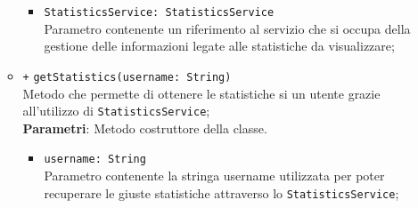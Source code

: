 \begin{itemize}
\begin{itemize}
\begin{itemize}
			\item \texttt{StatisticsService: StatisticsService} \\
			Parametro contenente un riferimento al servizio che si occupa della gestione delle informazioni legate alle statistiche da visualizzare;
		\end{itemize}
		\item \texttt{+} \texttt{getStatistics(username: String)} \\ 
		Metodo che permette di ottenere le statistiche si un utente grazie all'utilizzo di \texttt{StatisticsService}; \\
		\textbf{Parametri}: 
		Metodo costruttore della classe. \\
		\begin{itemize}
			\item \texttt{username: String} \\
			Parametro contenente la stringa username utilizzata per poter recuperare le giuste statistiche attraverso lo \texttt{StatisticsService}; 
		\end{itemize}
	\end{itemize}
\end{itemize}

